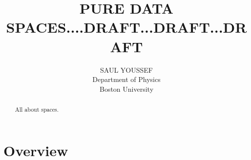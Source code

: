 \documentclass[11pt]{article}
\begin{document}
\title{\bf {PURE DATA SPACES....DRAFT...DRAFT...DRAFT}}
\author{%
  SAUL YOUSSEF%
  \hfil \\
  Department of Physics \\
  Boston University \\
}
\maketitle
\begin{abstract}
All about spaces.
\end{abstract}


\newtheorem*{fact}{Fact}

\newtheorem{definition}{Definition}

\newtheorem*{remark}{}

\section{Overview}
\end{document}
